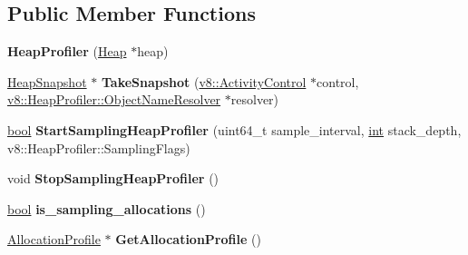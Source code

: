 \subsection*{Public Member Functions}
\begin{DoxyCompactItemize}
\item 
\mbox{\label{classv8_1_1internal_1_1HeapProfiler_a9db62c5fefbbac5e205b512ae91ab7a5}} 
{\bfseries Heap\+Profiler} (\mbox{\hyperlink{classv8_1_1internal_1_1Heap}{Heap}} $\ast$heap)
\item 
\mbox{\label{classv8_1_1internal_1_1HeapProfiler_a73df699bfc0779341b604234eeb6d809}} 
\mbox{\hyperlink{classv8_1_1internal_1_1HeapSnapshot}{Heap\+Snapshot}} $\ast$ {\bfseries Take\+Snapshot} (\mbox{\hyperlink{classv8_1_1ActivityControl}{v8\+::\+Activity\+Control}} $\ast$control, \mbox{\hyperlink{classv8_1_1HeapProfiler_1_1ObjectNameResolver}{v8\+::\+Heap\+Profiler\+::\+Object\+Name\+Resolver}} $\ast$resolver)
\item 
\mbox{\label{classv8_1_1internal_1_1HeapProfiler_aa552bb2e9de9ebc13562a8e0ee7130f9}} 
\mbox{\hyperlink{classbool}{bool}} {\bfseries Start\+Sampling\+Heap\+Profiler} (uint64\+\_\+t sample\+\_\+interval, \mbox{\hyperlink{classint}{int}} stack\+\_\+depth, v8\+::\+Heap\+Profiler\+::\+Sampling\+Flags)
\item 
\mbox{\label{classv8_1_1internal_1_1HeapProfiler_a41401a85a0bebc56c4e9f7181de92e25}} 
void {\bfseries Stop\+Sampling\+Heap\+Profiler} ()
\item 
\mbox{\label{classv8_1_1internal_1_1HeapProfiler_a86086b88dc16e57899c00bf16d963e54}} 
\mbox{\hyperlink{classbool}{bool}} {\bfseries is\+\_\+sampling\+\_\+allocations} ()
\item 
\mbox{\label{classv8_1_1internal_1_1HeapProfiler_a99eb6162d9266d584c75119074cddde6}} 
\mbox{\hyperlink{classv8_1_1internal_1_1AllocationProfile}{Allocation\+Profile}} $\ast$ {\bfseries Get\+Allocation\+Profile} ()
\item 
\mbox{\label{classv8_1_1internal_1_1HeapProfiler_a7efaf5b020faba52d5006f6122977fb2}} 

\end{DoxyCompactItemize}
